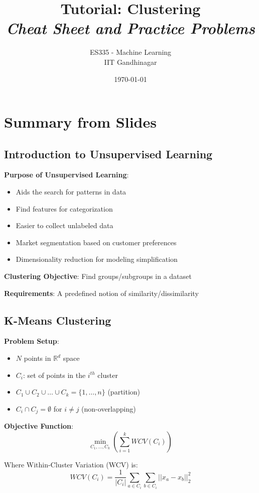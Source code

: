 \documentclass{article}
\title{\textbf{Tutorial: Clustering} \\ \textit{Cheat Sheet and Practice Problems}}
\author{ES335 - Machine Learning \\ IIT Gandhinagar}
\date{\today}
\begin{document}
\maketitle

\section{Summary from Slides}

\subsection{Introduction to Unsupervised Learning}

\textbf{Purpose of Unsupervised Learning}:
\begin{itemize}
    \item Aids the search for patterns in data
    \item Find features for categorization
    \item Easier to collect unlabeled data
    \item Market segmentation based on customer preferences
    \item Dimensionality reduction for modeling simplification
\end{itemize}

\textbf{Clustering Objective}: Find groups/subgroups in a dataset

\textbf{Requirements}: A predefined notion of similarity/dissimilarity

\subsection{K-Means Clustering}

\textbf{Problem Setup}:
\begin{itemize}
    \item $N$ points in $\mathbb{R}^d$ space
    \item $C_i$: set of points in the $i^{th}$ cluster
    \item $C_1 \cup C_2 \cup \ldots \cup C_k = \{1, \ldots, n\}$ (partition)
    \item $C_i \cap C_j = \emptyset$ for $i \neq j$ (non-overlapping)
\end{itemize}

\textbf{Objective Function}:
$$\min_{C_1,\ldots,C_k} \left( \sum_{i=1}^{k} WCV(C_i) \right)$$

Where Within-Cluster Variation (WCV) is:
$$WCV(C_i) = \frac{1}{|C_i|}\sum_{a \in C_i}\sum_{b \in C_i}||x_a - x_b||_2^2$$
\end{document}
